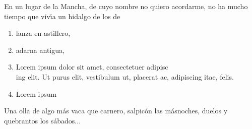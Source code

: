 \documentclass[10pt]{article}
\begin{document}
En un lugar de la Mancha, de cuyo nombre no quiero acordarme,
no ha mucho tiempo que viv\'{\i}a un hidalgo de los de
\begin{enumerate}[leftmargin=0pt, widest=0, itemindent=0pt,  labelindent=*, align=left]
    \DrawEnumitemLabel
    \item lanza en astillero,
    \item adarna antigua,
    \item Lorem ipsum dolor sit amet, consectetuer adipisc\\ing elit. Ut purus elit, vestibulum ut, placerat ac, adipiscing itae, felis.
    \item Lorem ipsum
\end{enumerate}
Una olla de algo m\'{a}s vaca que carnero, salpic\'{o}n las m\'{a}snoches, duelos y quebrantos los s\'{a}bados...
\end{document}
